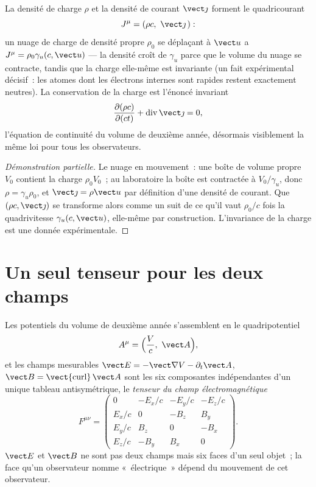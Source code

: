 \begin{proposition}\label{prop:b3:covariant-electromagnetism:fourcurrent}
La densité de charge $\rho$ et la densité de courant $\vect\jmath$
forment le quadricourant
\[
J^\mu = (\rho c,\ \vect\jmath\,) :
\]
un nuage de charge de densité propre $\rho_0$ se déplaçant à $\vect u$
a $J^\mu = \rho_0\gamma_u(c, \vect u)$ --- la densité croît de
$\gamma_u$ parce que le volume du nuage se contracte, tandis que la
charge elle-même est invariante (un fait expérimental décisif~: les
atomes dont les électrons internes sont rapides restent exactement
neutres). La conservation de la charge est l'énoncé invariant
\[
\frac{\partial(\rho c)}{\partial(ct)} +
\operatorname{div}\vect\jmath = 0 ,
\]
l'équation de continuité du volume de deuxième année, désormais
visiblement la même loi pour tous les observateurs.
\end{proposition}

\begin{proof}[Démonstration partielle]
Le nuage en mouvement~: une boîte de volume propre $V_0$ contient la charge $\rho_0
V_0$~; au laboratoire la boîte est contractée à $V_0/\gamma_u$, donc $\rho =
\gamma_u\rho_0$, et $\vect\jmath = \rho\vect u$ par définition d'une
densité de courant. Que $(\rho c, \vect\jmath)$ se transforme alors
comme un  suit de ce qu'il vaut $\rho_0/c$ fois la
quadrivitesse $\gamma_u(c, \vect u)$, elle-même  par
construction. L'invariance de la charge est une donnée expérimentale.
\end{proof}

\section{Un seul tenseur pour les deux champs}

\begin{definition}\label{def:b3:covariant-electromagnetism:tensor}
Les potentiels du volume de deuxième année s'assemblent en le quadripotentiel
\[
A^\mu = \Big(\frac{V}{c},\ \vect A\Big) ,
\]
et les champs mesurables $\vect E = -\vect\nabla V -
\partial_t\vect A$, $\vect B = \operatorname{\vect{curl}}\vect A$ sont
les six composantes indépendantes d'un unique tableau antisymétrique,
le \emph{tenseur du champ électromagnétique}
\[
F^{\mu\nu} =
\begin{pmatrix}
0 & -E_x/c & -E_y/c & -E_z/c\\
E_x/c & 0 & -B_z & B_y\\
E_y/c & B_z & 0 & -B_x\\
E_z/c & -B_y & B_x & 0
\end{pmatrix} .
\]
$\vect E$ et $\vect B$ ne sont pas deux champs mais six faces d'un
seul objet~; la face qu'un observateur nomme «~électrique~» dépend du
mouvement de cet observateur.
\end{definition}

